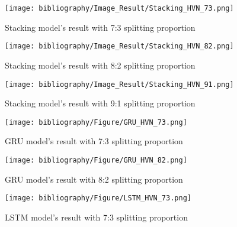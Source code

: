 \documentclass{ieeeojies}
\begin{document}
\vspace{-2em}
\begin{figure}[H]
  \centering
  \begin{minipage}{0.8\linewidth}
    \centering
    \texttt{[image: bibliography/Image\_Result/Stacking\_HVN\_73.png]}
    \caption{Stacking model's result with 7:3 splitting proportion}
    \label{fig8}
  \end{minipage}
\end{figure}
\begin{figure}[H]
  \centering
  \begin{minipage}{0.8\linewidth}
    \centering
    \texttt{[image: bibliography/Image\_Result/Stacking\_HVN\_82.png]}
    \caption{Stacking model's result with 8:2 splitting proportion}
    \label{fig9}
  \end{minipage}
\end{figure}

\begin{figure}[H]
  \centering
  \begin{minipage}{0.8\linewidth}
    \centering
    \texttt{[image: bibliography/Image\_Result/Stacking\_HVN\_91.png]}
    \caption{Stacking model's result with 9:1 splitting proportion}
    \label{fig8}
  \end{minipage}
\end{figure}

\begin{figure}[H]
  \centering
  \begin{minipage}{0.8\linewidth}
    \centering
    \texttt{[image: bibliography/Figure/GRU\_HVN\_73.png]}
    \caption{GRU model's result with 7:3 splitting proportion}
    \label{fig9}
  \end{minipage}
\end{figure}

\begin{figure}[H]
  \centering
  \begin{minipage}{0.8\linewidth}
    \centering
    \texttt{[image: bibliography/Figure/GRU\_HVN\_82.png]}
    \caption{GRU model's result with 8:2 splitting proportion}
    \label{fig8}
  \end{minipage}
\end{figure}

\begin{figure}[H]
  \centering
  \begin{minipage}{0.8\linewidth}
    \centering
    \texttt{[image: bibliography/Figure/LSTM\_HVN\_73.png]}
    \caption{LSTM model's result with 7:3 splitting proportion}
    \label{fig8}
  \end{minipage}
\end{figure}
\end{document}

